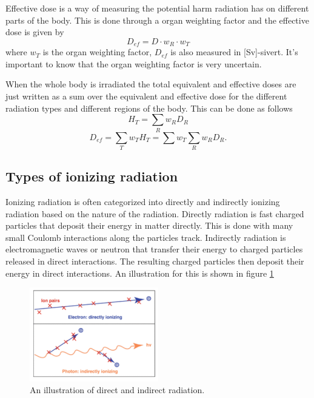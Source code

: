\documentclass[jmp, amsmath, amssymb, reprint]{article}
\numberwithin{equation}{section}
\begin{document}
\begin{multicols}{2}
Effective dose is a way of measuring the potential harm radiation has on different parts of the body. This is done through a organ weighting factor and the effective dose is given by
\begin{equation}
D_{ef}=D\cdot w_R\cdot w_T
\end{equation}
where \(w_T\) is the organ weighting factor, \(D_{ef}\) is also measured in [Sv]-sivert. It's important to know that the organ weighting factor is very uncertain.

When the whole body is irradiated the total equivalent and effective doses are just written as a sum over the equivalent and effective dose for the different radiation types and different regions of the body. This can be done as follows
\begin{equation}
H_T=\sum_R w_RD_R
\end{equation}
\begin{equation}
D_{ef}=\sum_Tw_TH_T=\sum w_T\sum_R w_RD_R.
\end{equation}

\subsection{Types of ionizing radiation}

Ionizing radiation is often categorized into directly and indirectly ionizing radiation based on the nature of the radiation. Directly radiation is fast charged particles that deposit their energy in matter directly. This is done with many small Coulomb interactions along the particles track. Indirectly radiation is electromagnetic waves or neutron that transfer their energy to charged particles released in direct interactions. The resulting charged particles then deposit their energy in direct interactions. An illustration for this is shown in figure \ref{fig:direct_indirect}

\begin{figure}[H]
	\centering
  	\includegraphics[width=0.50\textwidth]{direct_indirect.png}
	\caption{An illustration of direct and indirect radiation.}
	\label{fig:direct_indirect}
\end{figure}


\end{multicols}
\end{document}
